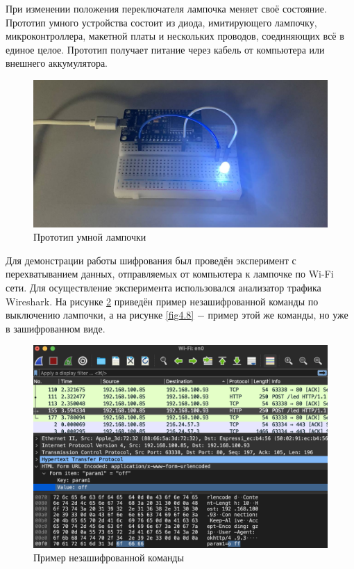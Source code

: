 	При изменении положения переключателя лампочка меняет своё состояние. Прототип умного устройства
	состоит из диода, имитирующего лампочку, микроконтроллера, макетной платы и нескольких проводов,
	соединяющих всё в единое целое. Прототип получает питание через кабель от компьютера или внешнего
	аккумулятора.
	
	\begin{figure}[H]
		\centering
		\includegraphics[scale=0.3]{resources/device-prototype}
		\caption{Прототип умной лампочки}
		\label{fig4.6}
	\end{figure}

	Для демонстрации работы шифрования был проведён эксперимент с перехватыванием данных, отправляемых
	от компьютера к лампочке по Wi-Fi сети. Для осуществление эксперимента использовался анализатор трафика
	Wireshark. На рисунке \ref{fig4.7} приведён пример незашифрованной команды по выключению лампочки,
	а на рисунке \ref{fig4.8} $-$ пример этой же команды, но уже в зашифрованном виде.
	
	\begin{figure}[h]
		\centering
		\includegraphics[scale=0.6]{resources/wireshark-encryption-disabled}
		\caption{Пример незашифрованной команды}
		\label{fig4.7}
	\end{figure}

